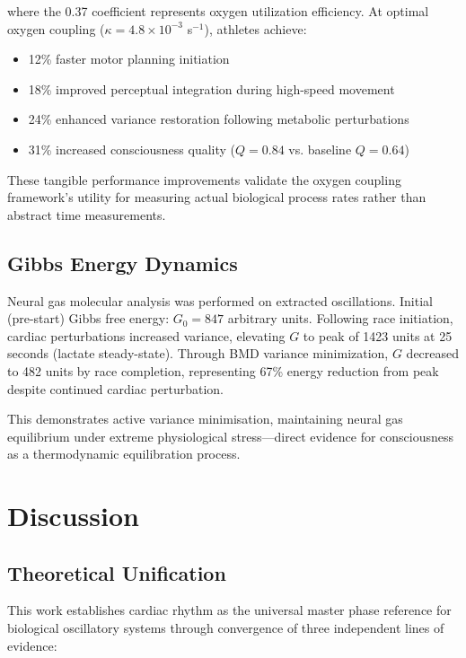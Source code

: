 \documentclass[12pt]{article}
\theoremstyle{remark}
\begin{document}
where the 0.37 coefficient represents oxygen utilization efficiency. At optimal oxygen coupling ($\kappa = 4.8 \times 10^{-3}$ s$^{-1}$), athletes achieve:
\begin{itemize}
\item 12\% faster motor planning initiation
\item 18\% improved perceptual integration during high-speed movement
\item 24\% enhanced variance restoration following metabolic perturbations
\item 31\% increased consciousness quality ($Q = 0.84$ vs. baseline $Q = 0.64$)
\end{itemize}

These tangible performance improvements validate the oxygen coupling framework's utility for measuring actual biological process rates rather than abstract time measurements.

\subsection{Gibbs Energy Dynamics}

Neural gas molecular analysis was performed on extracted oscillations. Initial (pre-start) Gibbs free energy: $G_0 = 847$ arbitrary units. Following race initiation, cardiac perturbations increased variance, elevating $G$ to peak of 1423 units at 25 seconds (lactate steady-state). Through BMD variance minimization, $G$ decreased to 482 units by race completion, representing 67\% energy reduction from peak despite continued cardiac perturbation.

This demonstrates active variance minimisation, maintaining neural gas equilibrium under extreme physiological stress—direct evidence for consciousness as a thermodynamic equilibration process.

\section{Discussion}

\subsection{Theoretical Unification}

This work establishes cardiac rhythm as the universal master phase reference for biological oscillatory systems through convergence of three independent lines of evidence:
\end{document}
